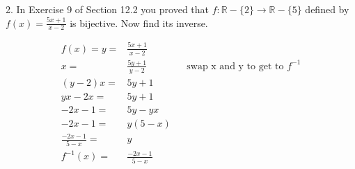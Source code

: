 \documentclass{hippoidC}
\begin{document}
\begin{prooflist}{2. In Exercise 9 of Section 12.2 you proved that $f:
			\mathbb{R}-\{2\} \rightarrow \mathbb{R}-\{5\}$ defined by $f(x)=\frac{5
				x+1}{x-2}$ is bijective. Now find its inverse.}
	\item
	\begin{align*}
		f(x)=y=            & \frac{5 x+1}{x-2}                                           \\
		x=                 & \frac{5y+1}{y-2}  &  & \text{swap x and y to get to }f^{-1} \\
		(y-2)x=            & 5y+1                                                        \\
		yx-2x=             & 5y+1                                                        \\
		-2x-1=             & 5y-yx                                                       \\
		-2x-1=             & y(5-x)                                                      \\
		\frac{-2x-1}{5-x}= & y                                                           \\
		f^{-1}(x) =        & \frac{-2x-1}{5-x}
	\end{align*}
\end{prooflist}
\end{document}
